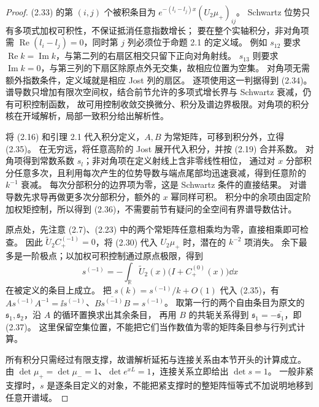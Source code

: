 \begin{proof}
(2.33) 的第 $(i,j)$ 个被积条目为
$e^{-(l_i-l_j)x}(U_2\mu_+)_{ij}$。
Schwartz 位势只有多项式加权可积性，不保证抵消任意指数增长；
要在整个实轴积分，非对角项需 $\operatorname{Re}(l_i-l_j)=0$，同时第 $j$ 列必须位于命题 2.1 的定义域。
例如 $s_{12}$ 要求 $\operatorname{Re}k=\operatorname{Im}k$，与第二列的右扇区相交只留下正向对角射线。
$s_{13}$ 则要求 $\operatorname{Im}k=0$，与第三列的下扇区除原点外无交集，故相应位置为空集。
对角项无需额外指数条件，定义域就是相应 Jost 列的扇区。
逐项使用这一判据得到 (2.34)。
谱导数只增加有限次空间权，结合前节允许的多项式增长界与 Schwartz 衰减，仍有可积控制函数，
故可用控制收敛交换微分、积分及谱边界极限。对角项的积分核在开域解析，局部一致积分给出解析性。

将 (2.16) 和引理 2.1 代入积分定义，$A,B$ 为常矩阵，可移到积分外，立得 (2.35)。
在无穷远，将任意高阶的 Jost 展开代入积分，并按 (2.19) 合并系数。
对角项得到常数系数 $s_l$；非对角项在定义射线上含非零线性相位，
通过对 $x$ 分部积分任意多次，且利用每次产生的位势导数与端点尾部均迅速衰减，得到任意阶的 $k^{-1}$ 衰减。
每次分部积分的边界项为零，这是 Schwartz 条件的直接结果。
对谱导数先求导再做更多次分部积分，额外的 $x$ 幂同样可积。
积分中的余项由固定阶加权矩控制，所以得到 (2.36)，不需要前节有疑问的全空间有界谱导数估计。

原点处，先注意 (2.7)、(2.23) 中的两个常矩阵任意相乘均为零，直接相乘即可检查。
因此 $\widetilde U_2 C_+^{(-1)}=0$，将 (2.30) 代入 $U_2\mu_+$ 时，潜在的 $k^{-2}$ 项消失。
余下最多是一阶极点；以加权可积控制通过原点极限，得到
\[
s^{(-1)}=-\int_{\mathbb R}\widetilde U_2(x)
\bigl(I+C_+^{(0)}(x)\bigr)\dd x
\]
在被定义的条目上成立。
把 $s(k)=s^{(-1)}/k+O(1)$ 代入 (2.35)，有
$As^{(-1)}A^{-1}=\ii s^{(-1)}$、$B\overline{s^{(-1)}}B=s^{(-1)}$。
取第一行的两个自由条目为原文的 $\mathfrak s_1,\mathfrak s_2$，沿 $A$ 的循环置换求出其余条目，
再用 $B$ 的共轭关系得到 $\mathfrak s_1=-\overline{\mathfrak s_1}$，即 (2.37)。
这里保留空集位置，不能把它们当作数值为零的矩阵条目参与行列式计算。

所有积分只需经过有限支撑，故谱解析延拓与连接关系由本节开头的计算成立。
由 $\det\mu_+=\det\mu_-=1$、$\det e^{xL}=1$，连接关系立即给出 $\det s=1$。
一般非紧支撑时，$s$ 是逐条目定义的对象，不能把紧支撑时的整矩阵恒等式不加说明地移到任意开谱域。
\end{proof}
\begin{note}
\end{note}
